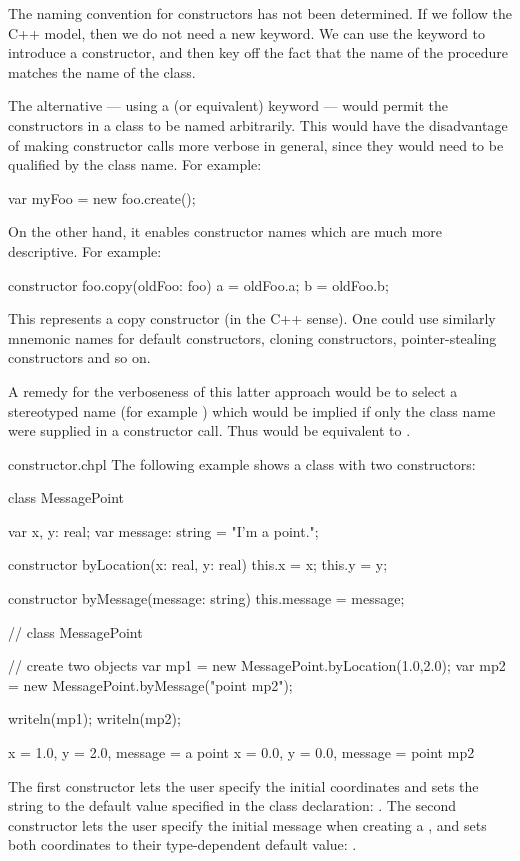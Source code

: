 \begin{openissue}
The naming convention for constructors has not been determined.  If we follow
the C++ model, then we do not need a new keyword.  We can use the 
keyword to introduce a constructor, and then key off the fact that the name of
the procedure matches the name of the class.

The alternative --- using a  (or equivalent) keyword --- would
permit the constructors in a class to be named arbitrarily.  This would have the
disadvantage of making constructor calls more verbose in general, since they
would need to be qualified by the class name.  For example:
\begin{chapel}
var myFoo = new foo.create();
\end{chapel}
On the other hand, it enables constructor names which are much more
descriptive.  For example:
\begin{chapel}
constructor foo.copy(oldFoo: foo) 
{ a = oldFoo.a; b = oldFoo.b; }
{ }
\end{chapel}
This represents a copy constructor (in the C++ sense).  One could use similarly
mnemonic names for default constructors, cloning constructors, pointer-stealing constructors and so
on.  

A remedy for the verboseness of this latter approach would be to select a
stereotyped name (for example ) which would be implied if only
the class name were supplied in a constructor call.  Thus  would be equivalent to .
\end{openissue}

\begin{chapelexample}{constructor.chpl}
The following example shows a class with two constructors:
\begin{chapel}
class MessagePoint {
  var x, y: real;
  var message: string = "I'm a point.";

  constructor byLocation(x: real, y: real) 
  { this.x = x; this.y = y; }
  {} 

  constructor byMessage(message: string) 
  { this.message = message; }
  {}
}  // class MessagePoint

// create two objects
var mp1 = new MessagePoint.byLocation(1.0,2.0);
var mp2 = new MessagePoint.byMessage("point mp2");
\end{chapel}
\begin{chapelpost}
writeln(mp1);
writeln(mp2);
\end{chapelpost}
\begin{chapeloutput}
{x = 1.0, y = 2.0, message = a point}
{x = 0.0, y = 0.0, message = point mp2}
\end{chapeloutput}
The first constructor lets the user specify the initial coordinates
and sets the string to the default value specified in the class
declaration: .  The second constructor lets the user specify the initial message
when creating a , and sets both coordinates to their
type-dependent default value: .
\end{chapelexample}

